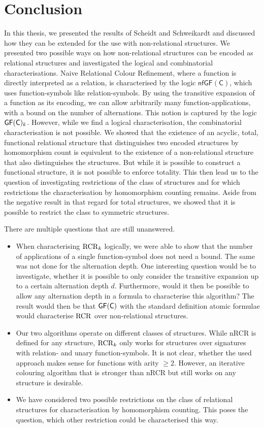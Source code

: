 \section{Conclusion}

In this thesis, we presented the results of Scheidt and Schweikardt \cite{scheidt2025ColorRefinement} and discussed how they can be extended for the use with non-relational structures.
We presented two possible ways on how non-relational structures can be encoded as relational structures and investigated the logical and combinatorial characterisations.
Naive Relational Colour Refinement, where a function is directly interpreted as a relation, is characterised by the logic $\mathsf{nfGF}(\mathsf C)$, which uses function-symbols like relation-symbols.
By using the transitive expansion of a function as its encoding, we can allow arbitrarily many function-applications, with a bound on the number of alternations. 
This notion is captured by the logic $\mathsf{GF}(\mathsf{C})_k$.
However, while we find a logical characterisation, the combinatorial characterisation is not possible.
We showed that the existence of an acyclic, total, functional relational structure that distinguishes two encoded structures by homomorphism count is equivalent to the existence of a non-relational structure that also distinguishes the structures.
But while it is possible to construct a functional structure, it is not possible to enforce totality.
This then lead us to the question of investigating restrictions of the class of structures and for which restrictions the characterisation by homomorphism counting remains.
Aside from the negative result in that regard for total structures, we showed that it is possible to restrict the class to symmetric structures.

There are multiple questions that are still unanswered.
\begin{itemize}
	\item When characterising $\operatorname{RCR}_k$ logically, we were able to show that the number of applications of a single function-symbol does not need a bound.
	The same was not done for the alternation depth.
	One interesting question would be to investigate, whether it is possible to only consider the transitive expansion up to a certain alternation depth $d$.
	Furthermore, would it then be possible to allow any alternation depth in a formula to characterise this algorithm?
	The result would then be that $\mathsf{GF}(\mathsf{C})$ with the standard definition atomic formulae would characterise $\operatorname{RCR}$ over non-relational structures.
	\item Our two algorithms operate on different classes of structures.
	While nRCR is defined for any structure, $\operatorname{RCR}_k$ only works for structures over signatures with relation- and unary function-symbols.
	It is not clear, whether the used approach makes sense for functions with arity $\geq 2$.
	However, an iterative colouring algorithm that is stronger than nRCR but still works on any structure is desirable.
	\item We have considered two possible restrictions on the class of relational structures for characterisation by homomorphism counting.
	This poses the question, which other restriction could be characterised this way.
\end{itemize}

